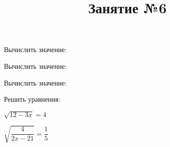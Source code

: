 %
%
\newpage
\title{Занятие №6}
\begin{listofex}
	\item Вычислить значение:
	\begin{enumcols}[itemcolumns=3]
		\item {}
		\item {}
		\item {}
		\item {}
		\item {}
		\item {}
	\end{enumcols}
	\item Вычислить значение:
	\begin{enumcols}[itemcolumns=2]
		\item {}
		\item {}
		\item {}
		\item {}
		\item {}
	\end{enumcols}
	\item Вычислить значение:
	\begin{enumcols}[itemcolumns=2]
		\item {}
		\item {}
		\item {}
	\end{enumcols}
	\item {}
	\item Решить уравнения:
	\begin{enumcols}[itemcolumns=2]
		\item {}
		\item \( \sqrt{12-3x}=4 \)
		\item \( \sqrt{\dfrac{4}{2x-21}}=\dfrac{1}{5} \)
		\item {}
	\end{enumcols}
\end{listofex}
%
%
